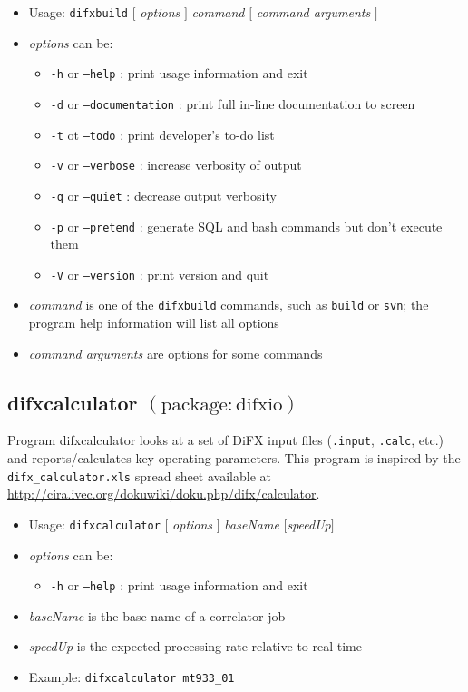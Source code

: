 \begin{itemize}
\item[] Usage: {\tt difxbuild} $[$ {\em options} $]$ {\em command} $[$ {\em command arguments} $]$ 
\item[] {\em options} can be:
\begin{itemize}
\item[] {\tt -h} or {\tt --help} : print usage information and exit
\item[] {\tt -d} or {\tt --documentation} : print full in-line documentation to screen
\item[] {\tt -t} ot {\tt --todo} : print developer's to-do list
\item[] {\tt -v} or {\tt --verbose} : increase verbosity of output
\item[] {\tt -q} or {\tt --quiet} : decrease output verbosity
\item[] {\tt -p} or {\tt --pretend} : generate SQL and bash commands but don't execute them
\item[] {\tt -V} or {\tt --version} : print version and quit
\end{itemize}
\item[] {\em command} is one of the {\tt difxbuild} commands, such as {\tt build} or {\tt svn}; the program help information will list all options
\item[] {\em command arguments} are options for some commands
\end{itemize}






\subsection{difxcalculator {\small $\mathrm{(package: difxio)}$}} \label{sec:difxcalculator}

Program difxcalculator looks at a set of DiFX input files ({\tt .input}, {\tt .calc}, etc.) and reports/calculates key operating parameters.
This program is inspired by the {\tt difx\_calculator.xls} spread sheet available at \url{http://cira.ivec.org/dokuwiki/doku.php/difx/calculator}.

\begin{itemize}
\item[] Usage: {\tt difxcalculator} $[$ {\em options} $]$ {\em baseName} $[${\em speedUp}$]$
\item[] {\em options} can be:
\begin{itemize}
\item[] {\tt -h} or {\tt --help} : print usage information and exit
\end{itemize}
\item[] {\em baseName} is the base name of a correlator job
\item[] {\em speedUp} is the expected processing rate relative to real-time
\item[] Example: {\tt difxcalculator mt933\_01}
\end{itemize}


